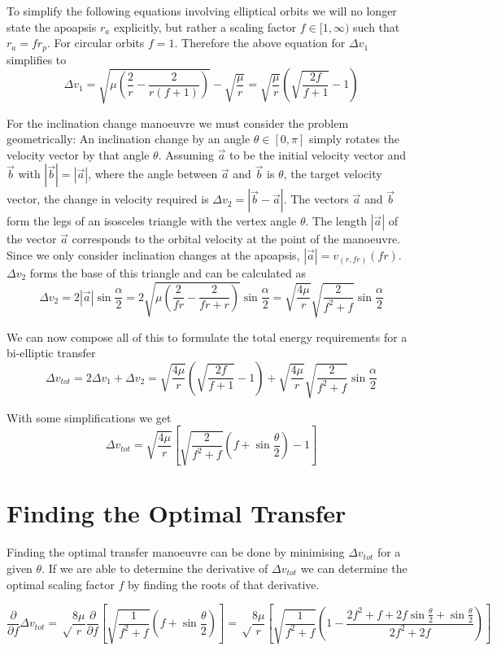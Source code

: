 \documentclass[a4paper, 11pt]{article}
\begin{document}
To simplify the following equations involving elliptical orbits we will no longer state the apoapsis $r_a$ explicitly, but rather a scaling factor $f \in [1, \infty)$ such that $r_a = fr_p$. For circular orbits $f=1$. Therefore the above equation for $\Delta{}v_1$ simplifies to
$$\Delta{}v_1
= \sqrt{\mu\left(\frac{2}{r}-\frac{2}{r(f+1)}\right)} - \sqrt{\frac{\mu}{r}}
= \sqrt{\frac{\mu}r}\left(   \sqrt{\frac{2f}{f+1}} - 1  \right)
$$

For the inclination change manoeuvre we must consider the problem geometrically: An inclination change by an angle $\theta \in [0,\pi]$ simply rotates the velocity vector by that angle $\theta$. Assuming $\vec{a}$ to be the initial velocity vector and $\vec{b}$ with $|\vec{b}| = |\vec{a}|$, where the angle between $\vec{a}$ and $\vec{b}$ is $\theta$, the target velocity vector, the change in velocity required is $\Delta{}v_2 = |\vec{b} - \vec{a}|$. The vectors $\vec{a}$ and $\vec{b}$ form the legs of an isosceles triangle with the vertex angle $\theta$.
The length $|\vec{a}|$ of the vector $\vec{a}$ corresponds to the orbital velocity at the point of the manoeuvre. Since we only consider inclination changes at the apoapsis, $|\vec{a}| = v_{(r,fr)}(fr)$. $\Delta{}v_2$ forms the base of this triangle and can be calculated as
$$\Delta{}v_2
= 2|\vec{a}|\sin\frac{\alpha}2
= 2\sqrt{  \mu \left(  \frac{2}{fr} - \frac{2}{fr + r}  \right) } \sin\frac{\alpha}2
= \sqrt{\frac{4\mu}r} \sqrt{\frac{2}{f^2+f}} \sin\frac{\alpha}2
$$

We can now compose all of this to formulate the total energy requirements for a bi-elliptic transfer
$$\Delta{}v_{tot}
= 2\Delta{}v_1 + \Delta{}v_2
= \sqrt{\frac{4\mu}r}\left( \sqrt{\frac{2f}{f+1}} - 1  \right) + \sqrt{\frac{4\mu}r} \sqrt{\frac{2}{f^2+f}} \sin\frac{\alpha}2$$

With some simplifications we get
$$\Delta{}v_{tot}= \sqrt{\frac{4\mu}r}\left[ \sqrt{\frac{2}{f^2 + f}} \left(f + \sin\frac{\theta}2 \right) - 1  \right]$$

\section{Finding the Optimal Transfer}
Finding the optimal transfer manoeuvre can be done by minimising $\Delta{}v_{tot}$ for a given $\theta$. If we are able to determine the derivative of $\Delta v_{tot}$ we can determine the optimal scaling factor $f$ by finding the roots of that derivative.

$$\frac{\partial}{\partial f}\Delta v_{tot}
= \sqrt\frac{8\mu}{r} \frac{\partial}{\partial f}\left[ \sqrt{\frac{1}{f^2+f}} \left( f + \sin\frac{\theta}{2} \right)\right]
= \sqrt\frac{8\mu}{r} \left[ \sqrt{\frac{1}{f^2+f}} \left(1- \frac{2f^2+f+2f\sin\frac\theta 2 + \sin\frac\theta 2}{2f^2+2f} \right)\right]
$$
\end{document}
